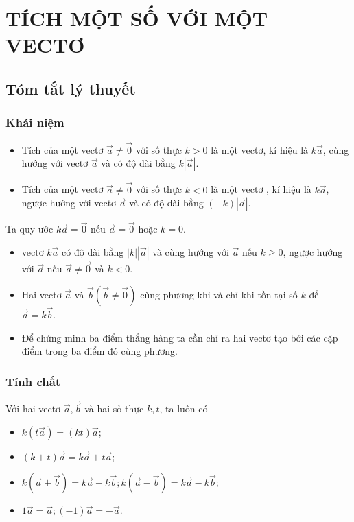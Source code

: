 \newpage\setcounter{dang}{0}
\section{TÍCH MỘT SỐ VỚI MỘT VECTƠ}
\subsection{Tóm tắt lý thuyết}
\begin{tomtat}
\subsubsection{Khái niệm}
\begin{itemize}
    \item Tích của một vectơ $\vec{a} \neq \vec{0}$ với số thực $k>0$ là một vectơ, kí hiệu là $k\vec{a}$, cùng hướng với vectơ  $\vec{a}$ và có độ dài bằng $k |\vec{a}|$.
    \item  Tích của một vectơ  $\vec{a} \neq \vec{0}$ với số thực $k<0$ là một vectơ , kí hiệu là $k\vec{a}$, ngược hướng với vectơ  $\vec{a}$ và có độ dài bằng $(-k) |\vec{a}|$.
\end{itemize}
\begin{note}
	Ta quy ước $k\vec{a}=\vec{0}$ nếu $\vec{a}=\vec{0}$ hoặc $k=0$.
\end{note}
\begin{nx}
	\textbf{}
\begin{itemize}
	\item 	vectơ  $k\vec{a}$ có độ dài bằng $|k||\vec{a}|$ và cùng hướng với $\vec{a}$ nếu $k\ge 0 $, ngược hướng với $\vec{a}$ nếu $\vec{a}\ne \vec{0}$ và $k<0$.
	\item Hai vectơ   $\vec{a}$ và $\vec{b} (\vec{b}\ne \vec{0})$ cùng phương khi và chỉ khi tồn tại số $k$ để $\vec{a}=k\vec{b}$.
	\item Để chứng minh ba điểm thẳng hàng ta cần chỉ ra hai vectơ  tạo bởi các cặp điểm trong ba điểm đó cùng phương.
\end{itemize}
\end{nx}
\subsubsection{Tính chất }
\begin{tc}
	 Với hai vectơ  $\vec{a}, \vec{b}$ và hai số thực $k, t$, ta luôn có
	 \begin{itemize}
	 	\item $k\left(t\vec{a}\right)=(kt)\vec{a}$;
	 	\item $(k+t)\vec{a}=k\vec{a}+t\vec{a}$;
	 	\item $k\left(\vec{a}+\vec{b}\right)=k\vec{a}+k\vec{b} ; k(\vec{a}-\vec{b})=k\vec{a}-k\vec{b}$;
	 	\item $1\vec{a}=\vec{a}; (-1)\vec{a}=-\vec{a}$.


\end{itemize}
\end{tc}
\end{tomtat}
